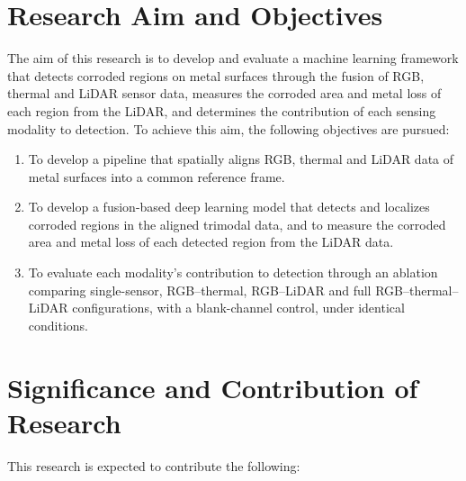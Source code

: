 \section{Research Aim and Objectives}
\label{sec:aim-objectives}

The aim of this research is to develop and evaluate a machine learning
framework that detects corroded regions on metal surfaces through the fusion
of RGB, thermal and LiDAR sensor data, measures the corroded area and metal
loss of each region from the LiDAR, and determines the contribution of each
sensing modality to detection. To achieve this aim, the following objectives
are pursued:

\begin{enumerate}[label=\arabic*),leftmargin=*,itemsep=6pt]
  \item To develop a pipeline that spatially aligns RGB, thermal and LiDAR
        data of metal surfaces into a common reference frame.
  \item To develop a fusion-based deep learning model that detects and
        localizes corroded regions in the aligned trimodal data, and to
        measure the corroded area and metal loss of each detected region from
        the LiDAR data.
  \item To evaluate each modality's contribution to detection through an
        ablation comparing single-sensor, RGB--thermal, RGB--LiDAR and full
        RGB--thermal--LiDAR configurations, with a blank-channel control,
        under identical conditions.
\end{enumerate}


\section{Significance and Contribution of Research}
\label{sec:significance}

This research is expected to contribute the following:

